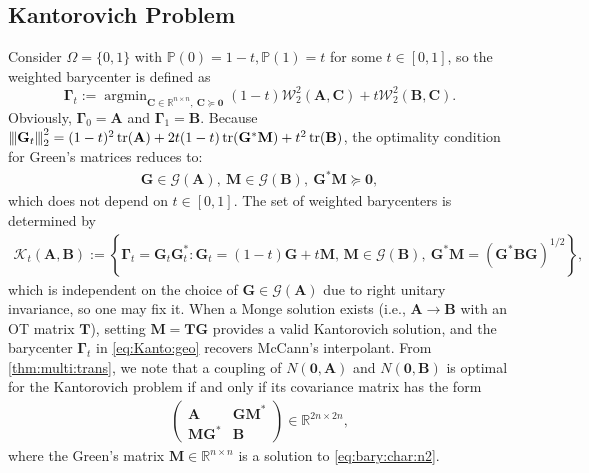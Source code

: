 \documentclass[noinfoline]{imsart}\setcounter{tocdepth}{2}
\renewcommand{\b}[1]{\mathbb{#1}} %
\newcommand{\m}[1]{\mathbf{#1}} %
\newcommand{\s}[1]{\mathscr{#1}} %
\renewcommand{\c}[1]{\mathcal{#1}} %
\DeclareMathOperator*{\tr}{tr}
\DeclareMathOperator*{\argmin}{\arg\min}
\newcommand{\vertii}[1]{{\vert\kern-0.25ex\vert\kern-0.25ex\vert #1 
    \vert\kern-0.25ex\vert\kern-0.25ex\vert}} %
\theoremstyle{plain}
\begin{document}
\subsection{Kantorovich Problem}\label{ssec:kanto}
Consider $\Omega = \{0, 1\}$ with $\b{P}({0}) = 1-t, \b{P}({1}) = t$ for some $t \in  [0, 1]$, so the weighted barycenter is defined as
\begin{equation*}
    \m{\Gamma}_{t} := \argmin_{\m{C} \in \b{R}^{n \times n}, \ \m{C} \succeq \m{0}}  (1-t) \c{W}_{2}^{2}(\m{A}, \m{C}) + t \c{W}_{2}^{2}(\m{B}, \m{C}). %
\end{equation*}
Obviously, $\m{\Gamma}_{0} = \m{A}$ and $\m{\Gamma}_{1} = \m{B}$. Because $\vertii{\m{G}_{t}}_{2}^{2} = (1-t)^{2} \tr(\m{A}) + 2 t(1-t) \tr(\m{G}^{*} \m{M}) + t^{2} \tr(\m{B})$, the optimality condition for Green's matrices reduces to:
\begin{align}\label{eq:bary:char:n2}
    \m{G} \in \s{G}(\m{A}), \ \m{M} \in \s{G}(\m{B}), \ \m{G}^{*} \m{M} \succeq \m{0},
\end{align}
which does not depend on $t \in [0, 1]$.
The set of weighted barycenters is determined by
\begin{align}\label{eq:Kanto:geo}
    \c{K}_{t}(\m{A}, \m{B}) := \left\{ \m{\Gamma}_{t} = \m{G}_{t} \m{G}_{t}^{*} : \m{G}_{t} = (1-t) \m{G} + t \m{M}, \, \m{M} \in \s{G}(\m{B}), \ \m{G}^{*} \m{M} = (\m{G}^{*} \m{B} \m{G})^{1/2} \right\},
\end{align}
which is independent on the choice of $\m{G} \in \s{G}(\m{A})$ due to right unitary invariance, so one may fix it. When a Monge solution exists (i.e., $\m{A} \to \m{B}$ with an OT matrix $\m{T}$), setting $\m{M} = \m{T} \m{G}$ provides a valid Kantorovich solution, and the barycenter $\m{\Gamma}_{t}$ in \eqref{eq:Kanto:geo} recovers McCann's interpolant. From \cref{thm:multi:trans}, we note that a coupling of $N(\m{0}, \m{A})$ and $N(\m{0}, \m{B})$ is optimal for the Kantorovich problem if and only if its covariance matrix has the form
\begin{align}\label{eq:Kanto:block}
    \begin{pmatrix}
    \m{A} & \m{G} \m{M}^{*} \\
    \m{M} \m{G}^{*} & \m{B}
    \end{pmatrix} \in \b{R}^{2n \times 2n},
\end{align}
where the Green's matrix $\m{M} \in \b{R}^{n \times n}$ is a solution to \eqref{eq:bary:char:n2}.
\end{document}
